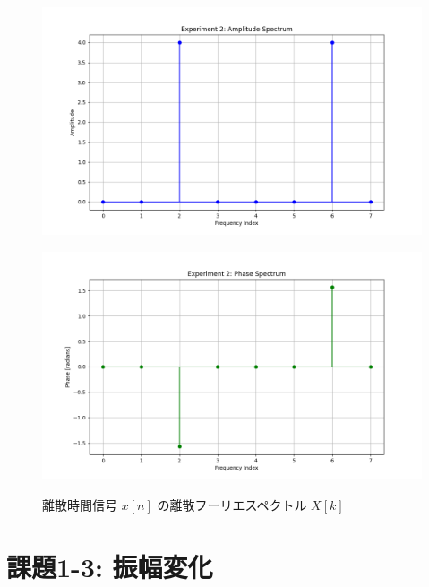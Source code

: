 \documentclass[fleqn, a4paper. 12pt]{jsarticle}
\begin{document}
  \begin{figure}[h]
    \begin{center}
    \begin{minipage}[t]{0.48\columnwidth}
        \includegraphics[width=\columnwidth]{amplitude_spectrum_experiment_2.png}
        \label{fign:a2}
    \end{minipage}
    \begin{minipage}[t]{0.48\columnwidth}
        \includegraphics[width=\columnwidth]{phase_spectrum_experiment_2.png}
        \label{fign:p2}
    \end{minipage}
    \end{center}
    \caption{離散時間信号 $x[n]$ の離散フーリエスペクトル $X[k]$}
  \end{figure}

  \newpage

  \section*{課題1-3: 振幅変化}
    
\end{document}
